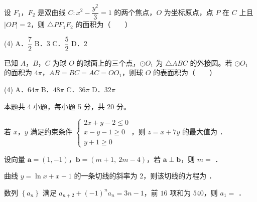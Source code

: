 \begin{question}
设 $F_1$，$F_2$ 是双曲线 $C:x^{2}-\dfrac{y^{2}}3=1$ 的两个焦点，$O$ 为坐标原点，点 $P$ 在 $C$ 上且 $|OP|=2$，则 $\triangle PF_1F_2$ 的面积为\mbox{（　　）}

\begin{gkopts}(4)
\task A．$\dfrac72$
\task B．$3$
\task C．$\dfrac52$
\task D．$2$
\end{gkopts}

\end{question}
\begin{question}
已知 $A$，$B$，$C$ 为球 $O$ 的球面上的三个点，$\odot O_1$ 为 $\triangle ABC$ 的外接圆。若 $\odot O_1$ 的面积为 $4\pi$，$AB=BC=AC=OO_1$，则球 $O$ 的表面积为\mbox{（　　）}

\begin{gkopts}(4)
\task A．$64\pi$
\task B．$48\pi$
\task C．$36\pi$
\task D．$32\pi$
\end{gkopts}

\par\medskip

\end{question}

\begin{gktip}
本题共 4 小题，每小题 5 分，共 20 分。
\end{gktip}

\begin{question}
若 $x$，$y$ 满足约束条件 $\begin{cases}2x+y-2\le0\\ x-y-1\ge0\\ y+1\ge0\end{cases}$，则 $z=x+7y$ 的最大值为 \gkblank{}．

\end{question}
\begin{question}
设向量 $\boldsymbol a=(1,-1)$，$\boldsymbol b=(m+1,\ 2m-4)$，若 $\boldsymbol a\perp\boldsymbol b$，则 $m=$ \gkblank{}．

\end{question}
\begin{question}
曲线 $y=\ln x+x+1$ 的一条切线的斜率为 $2$，则该切线的方程为 \gkblank{}．

\end{question}
\begin{question}
数列 $\left\{a_n\right\}$ 满足 $a_{n+2}+(-1)^{n}a_n=3n-1$，前 $16$ 项和为 $540$，则 $a_1=$ \gkblank{}．

\par\medskip

\end{question}

